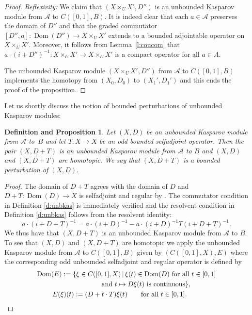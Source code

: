 \documentclass[pdftex]{sigma}
\numberwithin{equation}{section}
\newtheorem{dfnprop}[Theorem]{Definition and Proposition}
\newcommand{\cd}{\cdot}
\newcommand{\ti}{\times}
\newcommand{\s}[1]{\mathscr{#1}}
\begin{document}
\begin{proof}{\it Reflexivity:}
We claim that $(X \ti_U X',D'')$ is an unbounded Kasparov module from $\s A$ to $C([0,1],B)$. It is indeed clear that each $a \in \s A$ preserves the domain of $D''$ and that the graded commutator $[ D'', a ]\colon \operatorname{Dom}(D'') \to X \ti_U X'$ extends to a bounded adjointable operator on $X \ti_U X'$. Moreover, it follows from Lemma~\ref{l:coucom} that $a \cd (i + D'')^{-1}\colon X \ti_U X' \to X \ti_U X'$ is a compact operator for all $a \in A$.

The unbounded Kasparov module $(X \ti_U X',D'')$ from $\s A$ to $C( [0,1],B)$ implements the homotopy from $(X_0, D_0)$ to $(X_1',D_1')$ and this ends the proof of the proposition.
\end{proof}


Let us shortly discuss the notion of bounded perturbations of unbounded Kasparov modules:

\begin{dfnprop}\label{p:bddper}
Let $(X,D)$ be an unbounded Kasparov module from $\s A$ to~$B$ and let $T\colon X \to X$ be an odd bounded selfadjoint operator. Then the pair $(X, D + T)$ is an unbounded Kasparov module from $\s A$ to $B$ and $(X,D)$ and $(X, D + T)$ are homotopic. We say that $(X, D + T)$ is a \emph{bounded perturbation} of $(X,D)$.
\end{dfnprop}
\begin{proof}
The domain of $D + T$ agrees with the domain of $D$ and $D + T\colon \operatorname{Dom}(D) \to X$ is selfadjoint and regular by \cite[Example 1]{Wor:UAQ}. The commutator condition in Definition \ref{d:unbkas} is immediately verified and the resolvent condition in Definition \ref{d:unbkas} follows from the resolvent identity:
\[
a \cd (i + D + T)^{-1} = a \cd (i + D)^{-1} - a \cd (i + D)^{-1} T (i + D + T)^{-1} .
\]
We thus have that $(X, D + T)$ is an unbounded Kasparov module from $\s A$ to $B$. To see that $(X,D)$ and $(X, D + T)$ are homotopic we apply the unbounded Kasparov module from $\s A$ to $C( [0,1],B)$ given by $( C( [0,1],X), E)$ where the corresponding odd unbounded selfadjoint and regular operator is defined by
\begin{gather*}
\operatorname{Dom}(E) := \{ \xi \in C( [0,1],X) \,|\, \xi(t) \in \operatorname{Dom}(D) \ \text{for all} \ t \in [0,1] \\
\hphantom{\operatorname{Dom}(E) := \{}{} \text{and} \ t \mapsto D \xi(t) \ \text{is continuous} \},\\
E(\xi)(t) := (D + t \cd T)\xi(t) \qquad \text{for all } t \in [0,1] . \tag*{\qed}
\end{gather*}\renewcommand{\qed}{}
\end{proof}
\end{document}
